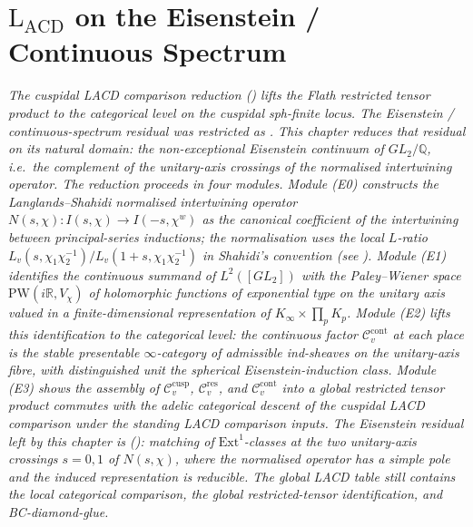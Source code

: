 \chapter{\(\mathrm{L}_{\mathrm{ACD}}\) on the Eisenstein / Continuous Spectrum}
\label{v4-arith:w6-d:chapter}

\emph{The cuspidal LACD comparison reduction
() lifts the Flath restricted
tensor product to the categorical level on the cuspidal sph-finite
locus. The Eisenstein / continuous-spectrum residual was restricted as
. This chapter reduces that
residual on its natural domain: the non-exceptional Eisenstein
continuum of \(GL_{2}/\mathbb{Q}\), i.e.\ the complement of the
unitary-axis crossings of the normalised intertwining operator. The
reduction proceeds in four modules. Module (E0) constructs the
Langlands--Shahidi normalised intertwining operator
\(N(s,\chi)\colon I(s,\chi)\to I(-s,\chi^{w})\) as the canonical
coefficient of the intertwining between principal-series
inductions; the normalisation uses the local \(L\)-ratio
\(L_{v}(s,\chi_{1}\chi_{2}^{-1})/L_{v}(1+s,\chi_{1}\chi_{2}^{-1})\)
in Shahidi's convention (see ). Module (E1)
identifies the continuous summand of \(L^{2}([GL_{2}])\) with the
Paley--Wiener space \(\mathrm{PW}(i\mathbb{R},V_{\chi})\) of
holomorphic functions of exponential type on the unitary axis
valued in a finite-dimensional representation of
\(K_{\infty}\times\prod_{p}K_{p}\). Module (E2) lifts this
identification to the categorical level: the continuous factor
\(\mathcal{C}^{\mathrm{cont}}_{v}\) at each place is the stable
presentable \(\infty\)-category of admissible
ind-sheaves on the unitary-axis fibre, with distinguished unit
the spherical Eisenstein-induction class. Module (E3) shows the
assembly of \(\mathcal{C}^{\mathrm{cusp}}_{v}\),
\(\mathcal{C}^{\mathrm{res}}_{v}\), and \(\mathcal{C}^{\mathrm{cont}}_{v}\)
into a global restricted tensor product commutes with the adelic
categorical descent of the cuspidal LACD comparison under the standing LACD comparison
inputs. The Eisenstein residual left by this chapter is
(): matching of
\(\mathrm{Ext}^1\)-classes at the two unitary-axis crossings \(s=0,1\) of
\(N(s,\chi)\), where the normalised operator has a simple pole and the
induced representation is reducible. The global LACD table still
contains the local categorical comparison, the global restricted-tensor
identification, and BC-diamond-glue.}

